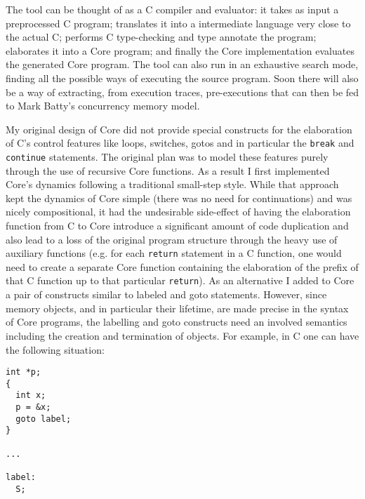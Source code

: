 \documentclass[11pt,a4paper, twocolumn]{article}
\begin{document}
The tool can be thought of as a C compiler and evaluator: it takes as
input a preprocessed C program; translates it into a intermediate
language very close to the actual C; performs C type-checking and type
annotate the program; elaborates it into a Core program; and finally
the Core implementation evaluates the generated Core program. The tool
can also run in an exhaustive search mode, finding all the possible
ways of executing the source program. Soon there will also be a way of
extracting, from execution traces, pre-executions that can then be fed
to Mark Batty's concurrency memory model.

My original design of Core did not provide special constructs for the
elaboration of C's control features like loops, switches, gotos and in
particular the \texttt{break} and \texttt{continue} statements. The
original plan was to model these features purely through the use of
recursive Core functions. As a result I first implemented Core's
dynamics following a traditional small-step style. While that approach
kept the dynamics of Core simple (there was no need for continuations)
and was nicely compositional, it had the undesirable side-effect of
having the elaboration function from C to Core introduce a significant
amount of code duplication and also lead to a loss of the original
program structure through the heavy use of auxiliary functions
(e.g. for each \texttt{return} statement in a C function, one would
need to create a separate Core function containing the elaboration of
the prefix of that C function up to that particular
\texttt{return}). As an alternative I added to Core a pair of
constructs similar to labeled and goto statements. However, since
memory objects, and in particular their lifetime, are made precise in
the syntax of Core programs, the labelling and goto constructs need an
involved semantics including the creation and termination of
objects. For example, in C one can have the following situation:

\begin{verbatim}
int *p;
{
  int x;
  p = &x;
  goto label;
}

...

label:
  S;
\end{verbatim}
\end{document}
